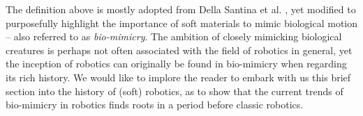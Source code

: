The definition above is mostly adopted from Della Santina et al. \cite{}, yet modified to purposefully highlight the importance of soft materials to mimic biological motion -- also referred to as \emph{bio-mimicry}. The ambition of closely mimicking biological creatures is perhaps not often associated with the field of robotics in general, yet the inception of robotics can originally be found in bio-mimicry when regarding its rich history. We would like to implore the reader to embark with us this brief section into the history of (soft) robotics, as to show that the current trends of bio-mimicry in robotics finds roots in a period before classic robotics.
%

